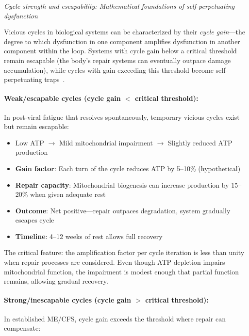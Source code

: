 \textit{Cycle strength and escapability: Mathematical foundations of self-perpetuating dysfunction}

Vicious cycles in biological systems can be characterized by their \textit{cycle gain}---the degree to which dysfunction in one component amplifies dysfunction in another component within the loop. Systems with cycle gain below a critical threshold remain escapable (the body's repair systems can eventually outpace damage accumulation), while cycles with gain exceeding this threshold become self-perpetuating traps~\cite{Kitano2004biological_robustness}.

\paragraph{Weak/escapable cycles (cycle gain $<$ critical threshold):}

In post-viral fatigue that resolves spontaneously, temporary vicious cycles exist but remain escapable:

\begin{itemize}
    \item Low ATP $\rightarrow$ Mild mitochondrial impairment $\rightarrow$ Slightly reduced ATP production
    \item \textbf{Gain factor}: Each turn of the cycle reduces ATP by 5--10\% (hypothetical)
    \item \textbf{Repair capacity}: Mitochondrial biogenesis can increase production by 15--20\% when given adequate rest
    \item \textbf{Outcome}: Net positive---repair outpaces degradation, system gradually escapes cycle
    \item \textbf{Timeline}: 4--12 weeks of rest allows full recovery
\end{itemize}

The critical feature: the amplification factor per cycle iteration is less than unity when repair processes are considered. Even though ATP depletion impairs mitochondrial function, the impairment is modest enough that partial function remains, allowing gradual recovery.

\paragraph{Strong/inescapable cycles (cycle gain $>$ critical threshold):}

In established ME/CFS, cycle gain exceeds the threshold where repair can compensate:

